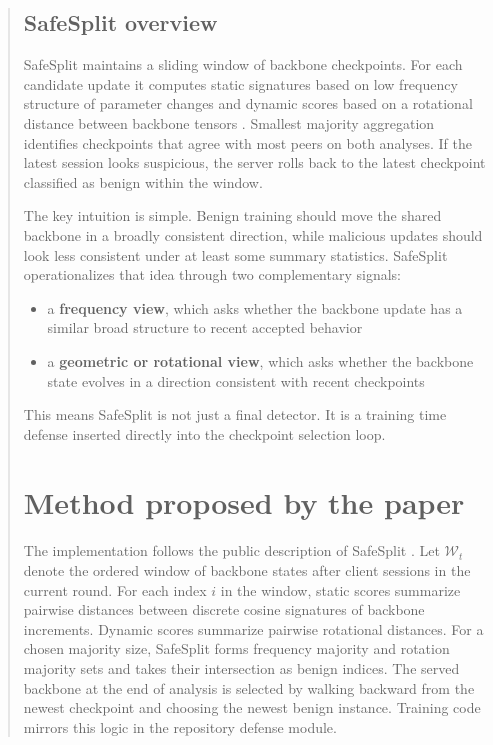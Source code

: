 \documentclass{article}
\begin{document}
\begin{abstract}
\subsection{SafeSplit overview}
\label{sec:safesplit_bg}

SafeSplit maintains a sliding window of backbone checkpoints. For each candidate update it computes static signatures based on low frequency structure of parameter changes and dynamic scores based on a rotational distance between backbone tensors \cite{safesplit2025}. Smallest majority aggregation identifies checkpoints that agree with most peers on both analyses. If the latest session looks suspicious, the server rolls back to the latest checkpoint classified as benign within the window.

The key intuition is simple. Benign training should move the shared backbone in a broadly consistent direction, while malicious updates should look less consistent under at least some summary statistics. SafeSplit operationalizes that idea through two complementary signals:
\begin{itemize}
    \item a \textbf{frequency view}, which asks whether the backbone update has a similar broad structure to recent accepted behavior
    \item a \textbf{geometric or rotational view}, which asks whether the backbone state evolves in a direction consistent with recent checkpoints
\end{itemize}

This means SafeSplit is not just a final detector. It is a training time defense inserted directly into the checkpoint selection loop.

\section{Method proposed by the paper}
\label{sec:method}

The implementation follows the public description of SafeSplit \cite{safesplit2025}. Let $\mathcal{W}_t$ denote the ordered window of backbone states after client sessions in the current round. For each index $i$ in the window, static scores summarize pairwise distances between discrete cosine signatures of backbone increments. Dynamic scores summarize pairwise rotational distances. For a chosen majority size, SafeSplit forms frequency majority and rotation majority sets and takes their intersection as benign indices. The served backbone at the end of analysis is selected by walking backward from the newest checkpoint and choosing the newest benign instance. Training code mirrors this logic in the repository defense module.


\end{abstract}
\end{document}

